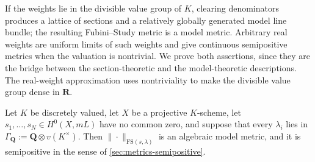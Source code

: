 If the weights lie in the divisible value group of $K$, clearing
denominators produces a lattice of sections and a relatively globally
generated model line bundle; the resulting Fubini--Study metric is a model
metric. Arbitrary real weights are uniform limits of such weights and give
continuous semipositive metrics when the valuation is nontrivial. We prove
both assertions, since they are the bridge between the section-theoretic and
the model-theoretic descriptions. The real-weight approximation uses
nontriviality to make the divisible value group dense in $\mathbf R$.

\begin{proposition}
\label{prop:metrics-fs-model}
Let $K$ be discretely valued, let $X$ be a projective $K$-scheme, let
$s_1,\ldots,s_N\in H^0(X,mL)$ have no common zero, and suppose that every
$\lambda_i$ lies in $\Gamma_{\mathbf Q}:=\mathbf Q\otimes v(K^\times)$.
Then $\|\cdot\|_{\mathrm{FS}(s,\lambda)}$ is an algebraic model metric,
and it is semipositive in the sense of
\cref{sec:metrics-semipositive}.
\end{proposition}

